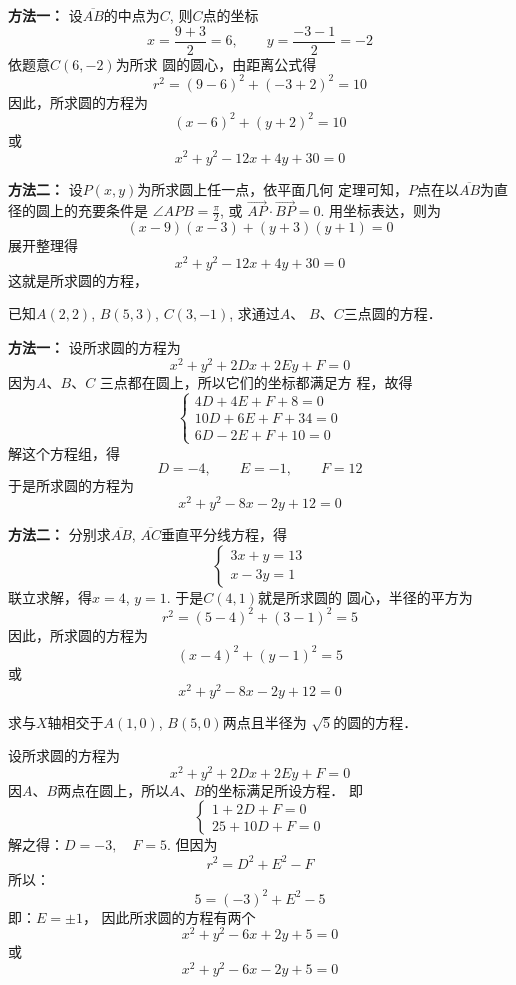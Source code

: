 \begin{solution}
\textbf{方法一：}  设$\overline{AB}$的中点为$C$, 则$C$点的坐标
\[x=\frac{9+3}{2}=6,\qquad y=\frac{-3-1}{2}=-2\]
依题意$C(6,-2)$为所求
圆的圆心，由距离公式得
\[r^2=(9-6)^2+(-3+2)^2=10\]
因此，所求圆的方程为
\[(x-6)^2+(y+2)^2=10\]
或
\[x^2+y^2-12x+4y+30=0\]

\textbf{方法二：}
 设$P(x,y)$为所求圆上任一点，依平面几何
定理可知，$P$点在以$\overline{AB}$为直径的圆上的充要条件是
$\angle APB=\frac{\pi}{2}$, 或
$\Vec{AP}\cdot \Vec{BP}=0$.
用坐标表达，则为
\[(x-9)(x-3)+(y+3)(y+1)=0\]
展开整理得
\[x^2+y^2-12x+4y+30=0\]
这就是所求圆的方程，
\end{solution}


\begin{example}
    已知$A(2,2)$, $B(5,3)$, $C(3,-1)$, 求通过$A$、
$B$、$C$三点圆的方程．
\end{example}


\begin{solution}
    \textbf{方法一：} 设所求圆的方程为
\[x^2+y^2+2Dx+2Ey+F=0\]
因为$A$、$B$、$C$ 三点都在圆上，所以它们的坐标都满足方
程，故得
\[\begin{cases}
    4D+4E+F+8=0\\
10D+6E+F+34=0\\
6D-2E+F+10=0
\end{cases}\]
解这个方程组，得
\[D=-4,\qquad E=-1,\qquad F=12\]
于是所求圆的方程为
\[x^2+y^2-8x-2y+12=0\]

\textbf{方法二：} 分别求$\overline{AB}$, $\overline{AC}$垂直平分线方程，得
\[\begin{cases}
   3x+y=13\\
x-3y=1
\end{cases}\]
联立求解，得$x=4$, $y=1$. 于是$C(4,1)$就是所求圆的
圆心，半径的平方为
\[r^2=(5-4)^2+(3-1)^2=5\]
因此，所求圆的方程为
\[(x-4)^2+(y-1)^2=5\]
或
\[x^2+y^2-8x-2y+12=0\]
\end{solution}

\begin{example}
    求与$X$轴相交于$A(1,0)$, $B(5,0)$两点且半径为
$\sqrt{5}$的圆的方程．
\end{example}

\begin{solution}
    设所求圆的方程为
\[x^2+y^2+2Dx+2Ey+F=0\]
因$A$、$B$两点在圆上，所以$A$、$B$的坐标满足所设方程．
即
\[\begin{cases}
    1+2D+F=0\\
25+10D+F=0
\end{cases}\]
解之得：$D=-3,\quad F=5$.
但因为
\[r^2=D^2+E^2-F\]
所以：
\[5=(-3)^2+E^2-5\]
即：$E=\pm 1$，
因此所求圆的方程有两个
\[x^2+y^2-6x+2y+5=0\]
或
\[x^2+y^2-6x-2y+5=0\]
\end{solution}

